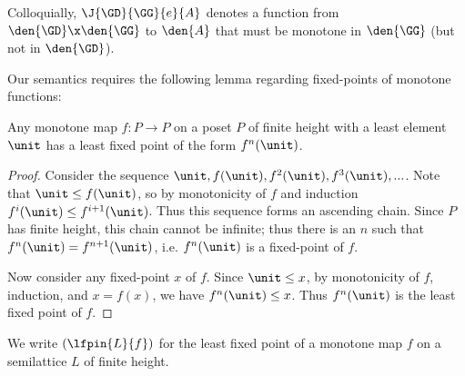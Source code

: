 Colloquially, $\J{\GD}{\GG}{e}{A}$ denotes a function from $\den{\GD} \x
\den{\GG}$ to $\den{A}$ that must be monotone in $\den{\GG}$ (but not in
$\den{\GD}$).

Our semantics requires the following lemma regarding fixed-points of monotone
functions:

\begin{lemma}
  Any monotone map $f : P \to P$ on a poset $P$ of finite height with a least
  element $\unit$ has a least fixed point of the form $f^n(\unit)$.
\end{lemma}

\begin{proof}
  Consider the sequence $\unit, f(\unit), f^2(\unit), f^3(\unit), ...$. Note that
  $\unit \le f(\unit)$, so by monotonicity of $f$ and induction $f^i(\unit) \le
  f^{i+1}(\unit)$. Thus this sequence forms an ascending chain. Since $P$ has
  finite height, this chain cannot be infinite; thus there is an $n$ such that
  $f^n(\unit) = f^{n+1}(\unit)$, i.e. $f^n(\unit)$ is a fixed-point of $f$.

  Now consider any fixed-point $x$ of $f$. Since $\unit \le x$, by monotonicity of
  $f$, induction, and $x = f(x)$, we have $f^n(\unit) \le x$. Thus $f^n(\unit)$ is
  the least fixed point of $f$.
\end{proof}

We write $(\lfpin{L}{f})$ for the least fixed point of a monotone map $f$ on a
semilattice $L$ of finite height.



